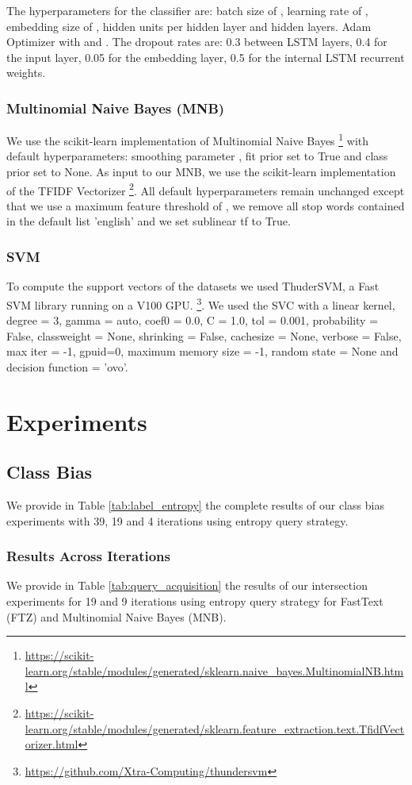 \documentclass[11pt,a4paper]{article}
\begin{document}
The hyperparameters for the classifier are: batch size of , learning rate of , embedding size of ,  hidden units per hidden layer and  hidden layers. Adam Optimizer with  and . The dropout rates are: 0.3 between LSTM layers, 0.4 for the input layer, 0.05 for the embedding layer, 0.5 for the internal LSTM recurrent weights.  

\subsubsection{Multinomial Naive Bayes (MNB)}
We use the scikit-learn implementation of Multinomial Naive Bayes \footnote{\url{https://scikit-learn.org/stable/modules/generated/sklearn.naive_bayes.MultinomialNB.html}} with default hyperparameters: smoothing parameter , fit prior set to True and class prior set to None. As input to our MNB, we use the scikit-learn implementation of the TFIDF Vectorizer \footnote{\url{https://scikit-learn.org/stable/modules/generated/sklearn.feature_extraction.text.TfidfVectorizer.html}}. All default hyperparameters remain unchanged except that we use a maximum feature threshold of , we remove all stop words contained in the default list 'english' and we set sublinear tf to True.

\subsubsection{SVM}
To compute the support vectors of the datasets we used ThuderSVM, a Fast SVM library running on a V100 GPU. \footnote{\url{https://github.com/Xtra-Computing/thundersvm}}. We used the SVC with a linear kernel, degree = 3, gamma = auto, coef0 = 0.0, C = 1.0, tol = 0.001, probability = False, classweight = None, shrinking = False, cachesize = None, verbose = False, max iter = -1, gpuid=0, maximum memory size = -1, random state = None and decision function = 'ovo'. 



\section{Experiments}

\subsection{Class Bias}
We provide in Table \ref{tab:label_entropy} the complete results of our class bias experiments with 39, 19 and 4 iterations using entropy query strategy. 
\subsubsection{Results Across Iterations}
We provide in Table \ref{tab:query_acquisition} the results of our intersection experiments for 19 and 9 iterations using entropy query strategy for FastText (FTZ) and Multinomial Naive Bayes (MNB). 
\end{document}
